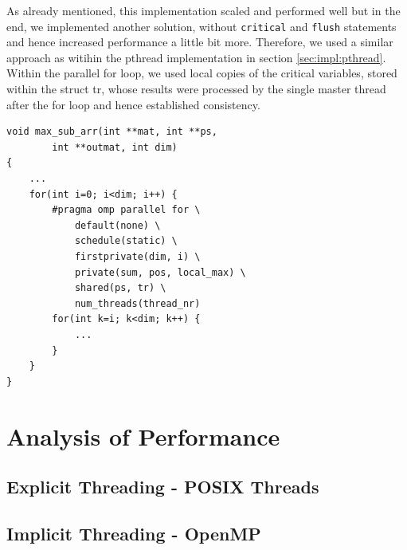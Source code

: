 \documentclass[conference]{IEEEtran}
\begin{document}
As already mentioned, this implementation scaled and performed well but in the end, we implemented another solution, without \texttt{critical} and \texttt{flush} statements and hence increased performance a little bit more. Therefore, we used a similar approach as witihin the pthread implementation in section \ref{sec:impl:pthread}. Within the parallel for loop, we used local copies of the critical variables, stored within the struct tr, whose results were processed by the single master thread after the for loop and hence established consistency. 


\begin{center}
   \begin{lstlisting}[captionpos=b, caption=OpenMP: Parallel Main Algorithm, label=lst:alg]  
void max_sub_arr(int **mat, int **ps,                                                  
        int **outmat, int dim)                                                   
{                                                              
    ...                                        
    for(int i=0; i<dim; i++) {                                 
        #pragma omp parallel for \                             
            default(none) \                                    
            schedule(static) \                                 
            firstprivate(dim, i) \                             
            private(sum, pos, local_max) \                     
            shared(ps, tr) \                                   
            num_threads(thread_nr)                                                                                          
        for(int k=i; k<dim; k++) { 
            ...
        }
    }
}
   \end{lstlisting}
\end{center}



\section{Analysis of Performance}
\label{sec:analysis}


\subsection{Explicit Threading - POSIX Threads}
\label{sec:analysis:pthread}



\subsection{Implicit Threading - OpenMP}
\label{sec:analysis:openmp}
\end{document}
